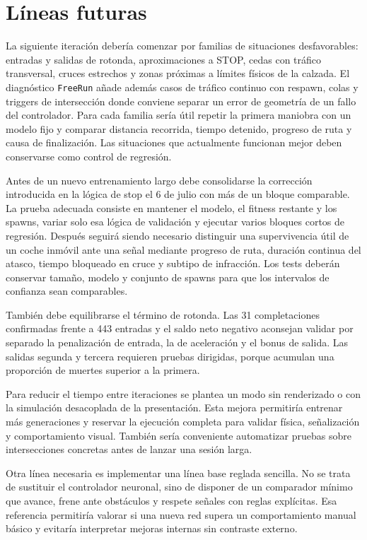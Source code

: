 \section{Líneas futuras}

La siguiente iteración debería comenzar por familias de situaciones desfavorables: entradas y salidas de rotonda, aproximaciones a STOP, cedas con tráfico transversal, cruces estrechos y zonas próximas a límites físicos de la calzada. El diagnóstico \texttt{FreeRun} añade además casos de tráfico continuo con respawn, colas y triggers de intersección donde conviene separar un error de geometría de un fallo del controlador. Para cada familia sería útil repetir la primera maniobra con un modelo fijo y comparar distancia recorrida, tiempo detenido, progreso de ruta y causa de finalización. Las situaciones que actualmente funcionan mejor deben conservarse como control de regresión.

Antes de un nuevo entrenamiento largo debe consolidarse la corrección introducida en la lógica de stop el 6 de julio con más de un bloque comparable. La prueba adecuada consiste en mantener el modelo, el fitness restante y los spawns, variar solo esa lógica de validación y ejecutar varios bloques cortos de regresión. Después seguirá siendo necesario distinguir una supervivencia útil de un coche inmóvil ante una señal mediante progreso de ruta, duración continua del atasco, tiempo bloqueado en cruce y subtipo de infracción. Los tests deberán conservar tamaño, modelo y conjunto de spawns para que los intervalos de confianza sean comparables.

También debe equilibrarse el término de rotonda. Las 31 completaciones confirmadas frente a 443 entradas y el saldo neto negativo aconsejan validar por separado la penalización de entrada, la de aceleración y el bonus de salida. Las salidas segunda y tercera requieren pruebas dirigidas, porque acumulan una proporción de muertes superior a la primera.

Para reducir el tiempo entre iteraciones se plantea un modo sin renderizado o con la simulación desacoplada de la presentación. Esta mejora permitiría entrenar más generaciones y reservar la ejecución completa para validar física, señalización y comportamiento visual. También sería conveniente automatizar pruebas sobre intersecciones concretas antes de lanzar una sesión larga.

Otra línea necesaria es implementar una línea base reglada sencilla. No se trata de sustituir el controlador neuronal, sino de disponer de un comparador mínimo que avance, frene ante obstáculos y respete señales con reglas explícitas. Esa referencia permitiría valorar si una nueva red supera un comportamiento manual básico y evitaría interpretar mejoras internas sin contraste externo.

